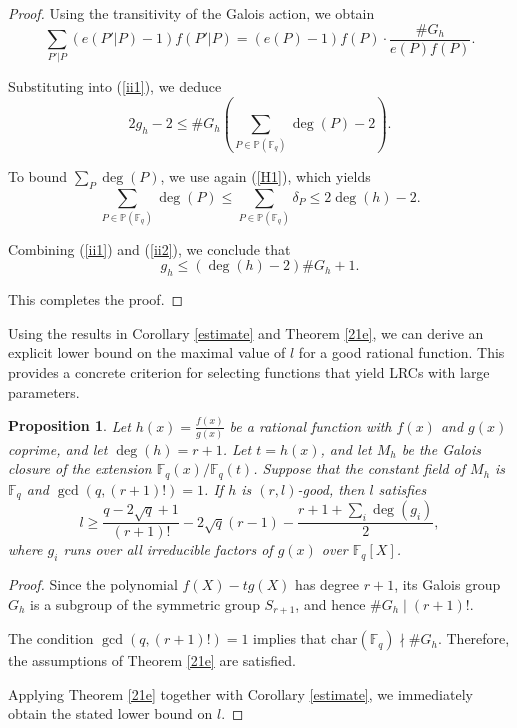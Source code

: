 \documentclass[1p,final]{elsarticle}
\newtheorem{proposition}[theorem]{Proposition}
\newtheorem{open problem}[theorem]{Open Problem}
\begin{document}
\begin{proof}
Using the transitivity of the Galois action, we obtain
\[
\sum_{P'|P}(e(P'|P)-1)f(P'|P)
=
(e(P)-1)f(P)\cdot \frac{\#G_{h}}{e(P)f(P)}.
\]

Substituting into (\ref{ii1}), we deduce
\[
2g_{h}-2
\le
\#G_{h}\left ( \sum_{P\in \mathbb{P}(\mathbb{F}_{q}) }\deg(P)-2 \right ).
\]

To bound $\sum_{P}\deg(P)$, we use again (\ref{H1}), which yields
\begin{equation}\label{ii2}
\sum_{P\in \mathbb{P}(\mathbb{F}_{q}) }\deg(P)
\le
\sum_{P\in \mathbb{P}(\mathbb{F}_{q}) }\delta_{P}
\le
2\deg(h)-2.
\end{equation}

Combining (\ref{ii1}) and (\ref{ii2}), we conclude that
\[
g_{h}\le (\deg(h)-2)\#G_{h}+1.
\]

This completes the proof.
\end{proof}


Using the results in Corollary \ref{estimate} and Theorem \ref{21e}, we can derive an explicit lower bound on the maximal value of $l$ for a good rational function. This provides a concrete criterion for selecting functions that yield LRCs with large parameters.

\begin{proposition}\label{pregene}
Let $h(x)=\displaystyle\frac{f(x)}{g(x)}$ be a rational function with $f(x)$ and $g(x)$ coprime, and let $\deg(h)=r+1$. Let $t=h(x)$, and let $M_{h}$ be the Galois closure of the extension $\mathbb{F}_q(x)/\mathbb{F}_q(t)$. Suppose that the constant field of $M_{h}$ is $\mathbb{F}_{q}$ and $\gcd\left ( q,(r+1)! \right )=1 $. If $h$ is $(r,l)$-good, then $l$ satisfies
\[
l \ge \frac{q-2\sqrt{q}+1}{(r+1)!}-2\sqrt{q}(r-1)-\frac{r+1+\sum_{i}\deg(g_{i})}{2},
\]
where $g_{i}$ runs over all irreducible factors of $g(x)$ over $\mathbb{F}_{q}\left [ X \right ]$.
\end{proposition}

\begin{proof}
Since the polynomial $f(X)-tg(X)$ has degree $r+1$, its Galois group $G_{h}$ is a subgroup of the symmetric group $S_{r+1}$, and hence $\#G_{h}\mid (r+1)!$.

The condition $\gcd\left ( q,(r+1)! \right )=1$ implies that $\text{char}(\mathbb{F}_{q})\nmid \#G_{h}$. Therefore, the assumptions of Theorem \ref{21e} are satisfied.

Applying Theorem \ref{21e} together with Corollary \ref{estimate}, we immediately obtain the stated lower bound on $l$.
\end{proof}
\end{document}
